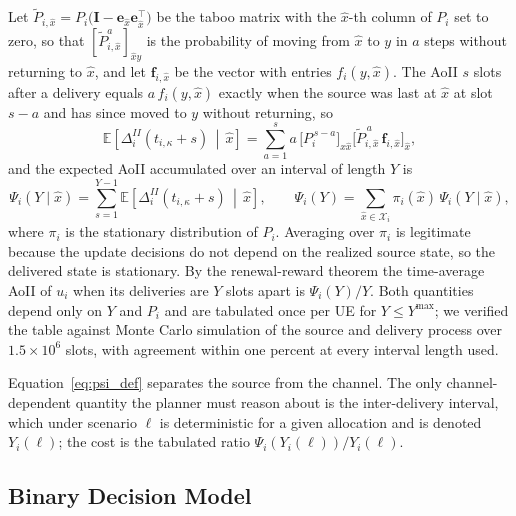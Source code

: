 Let $\tilde{P}_{i,\hat{x}}=P_i\bigl(\mathbf{I}-\mathbf{e}_{\hat{x}}\mathbf{e}_{\hat{x}}^{\top}\bigr)$ be the taboo
matrix with the $\hat{x}$-th column of $P_i$ set to zero, so that $[\tilde{P}_{i,\hat{x}}^{a}]_{\hat{x}y}$ is the
probability of moving from $\hat{x}$ to $y$ in $a$ steps without returning to $\hat{x}$, and let
$\mathbf{f}_{i,\hat{x}}$ be the vector with entries $f_i(y,\hat{x})$. The AoII $s$ slots after a delivery equals
$a\,f_i(y,\hat{x})$ exactly when the source was last at $\hat{x}$ at slot $s-a$ and has since moved to $y$ without
returning, so
\begin{equation}
    \mathbb{E}\!\left[\Delta_i^{II}(t_{i,\kappa}+s)\,\middle|\,\hat{x}\right]
    =\sum_{a=1}^{s} a\,\bigl[P_i^{\,s-a}\bigr]_{\hat{x}\hat{x}}
    \bigl[\tilde{P}_{i,\hat{x}}^{\,a}\,\mathbf{f}_{i,\hat{x}}\bigr]_{\hat{x}},
    \label{eq:aoii_slot}
\end{equation}
and the expected AoII accumulated over an interval of length $Y$ is
\begin{equation}
    \Psi_i(Y\mid\hat{x})=\sum_{s=1}^{Y-1}
    \mathbb{E}\!\left[\Delta_i^{II}(t_{i,\kappa}+s)\,\middle|\,\hat{x}\right],\qquad
    \Psi_i(Y)=\sum_{\hat{x}\in\mathcal{X}_i}\pi_i(\hat{x})\,\Psi_i(Y\mid\hat{x}),
    \label{eq:psi_def}
\end{equation}
where $\pi_i$ is the stationary distribution of $P_i$. Averaging over $\pi_i$ is legitimate because the update
decisions do not depend on the realized source state, so the delivered state is stationary. By the renewal-reward
theorem the time-average AoII of $u_i$ when its deliveries are $Y$ slots apart is $\Psi_i(Y)/Y$. Both quantities depend
only on $Y$ and $P_i$ and are tabulated once per UE for $Y\leq Y^{\max}$; we verified the table against Monte Carlo
simulation of the source and delivery process over $1.5\times 10^{6}$ slots, with agreement within one percent at every
interval length used.

Equation~\eqref{eq:psi_def} separates the source from the channel. The only channel-dependent quantity the planner
must reason about is the inter-delivery interval, which under scenario $\ell$ is deterministic for a given allocation
and is denoted $Y_i(\ell)$; the cost is the tabulated ratio $\Psi_i(Y_i(\ell))/Y_i(\ell)$.

\subsection{Binary Decision Model}


